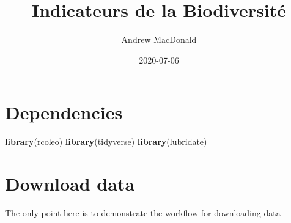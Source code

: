 \documentclass[
]{book}
\title{Indicateurs de la Biodiversité}
\author{Andrew MacDonald}
\date{2020-07-06}
\newenvironment{Shaded}{\begin{snugshade}}{\end{snugshade}}
\newcommand{\KeywordTok}[1]{\textcolor[rgb]{0.13,0.29,0.53}{\textbf{#1}}}
\newcommand{\NormalTok}[1]{#1}
\begin{document}
\maketitle

{
\setcounter{tocdepth}{1}
\tableofcontents
}
\hypertarget{dependencies}{%
\chapter{Dependencies}\label{dependencies}}

\begin{Shaded}
\begin{Highlighting}[]
\KeywordTok{library}\NormalTok{(rcoleo)}
\KeywordTok{library}\NormalTok{(tidyverse)}
\KeywordTok{library}\NormalTok{(lubridate)}
\end{Highlighting}
\end{Shaded}

\hypertarget{dl}{%
\chapter{Download data}\label{dl}}

The only point here is to demonstrate the workflow for downloading data
\end{document}
